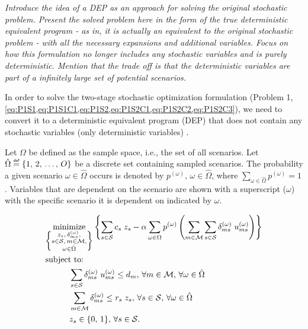 \documentclass[12pt,dvips]{report}
\newcommand\myeq{\mathrel{\overset{\makebox[0pt]{\mbox{\normalfont\tiny\sffamily def}}}{=}}}
\begin{document}
\textit{Introduce the idea of a DEP as an approach for solving the original stochastic problem.  Present the solved problem here in the form of the true deterministic equivalent program - as in, it is actually an equivalent to the original stochastic problem - with all the necessary expansions and additional variables.  Focus on how this formulation no longer includes any stochastic variables and is purely deterministic.  Mention that the trade off is that the deterministic variables are part of a infinitely large set of potential scenarios.}

In order to solve the two-stage stochastic optimization formulation (Problem 1, \cref{eq:P1S1,eq:P1S1C1,eq:P1S2,eq:P1S2C1,eq:P1S2C2,eq:P1S2C3}), we need to convert it to a deterministic equivalent program (DEP) that does not contain any stochastic variables (only deterministic variables) \cite{stochprogramming}.

Let $\Omega$ be defined as the sample space, i.e., the set of all scenarios.  Let $\hat{\Omega} \myeq \{1,\, 2,\, \ldots,\, O\}$ be a discrete set containing sampled scenarios.  The probability a given scenario $\omega \in \hat{\Omega}$ occurs is denoted by $p^{(\omega)},\, \omega \in \hat{\Omega}$, where $\sum_{\omega \in \hat{\Omega}} p^{(\omega)} = 1$.  Variables that are dependent on the scenario are shown with a superscript ($\omega$) with the specific scenario it is dependent on indicated by $\omega$.

\vspace{3mm}
\begin{tcolorbox}[title = Problem 2 (Deterministic Equivalent Program of Problem 1)]
\begin{align}
& \underset{\left\{ \substack{
	z_s,\, \delta_{ms}^{(\omega)},\\
	s \in \mathcal{S},\, m \in \mathcal{M},\\
	\omega \in \hat{\Omega}} \right\}} {\text{minimize}}
\left\{ \sum_{s \in \mathcal{S}} c_s \; z_s - \alpha \sum_{\omega \in \Omega} p^{(\omega)} \left( \sum_{m \in \mathcal{M}} \sum_{s \in \mathcal{S}} \delta_{ms}^{(\omega)} \; u_{ms}^{(\omega)} \right) \right\} \label{eq:P2}\\
& \text{subject to:}  \nonumber \\
& \hspace{0.4in} \sum_{s \in \mathcal{S}} \delta_{ms}^{(\omega)} \; u_{ms}^{(\omega)} \leq d_m,\, \forall m \in \mathcal{M},\, \forall \omega \in \hat{\Omega} \label{eq:P2C1}\\
& \hspace{0.4in} \sum_{m \in \mathcal{M}} \delta_{ms}^{(\omega)} \leq r_s \; z_s,\, \forall s \in \mathcal{S},\, \forall \omega \in \hat{\Omega} \label{eq:P2C2}\\
& \hspace{0.4in} z_s \in \{0,\, 1\},\, \forall s \in \mathcal{S}. \label{eq:P2C3}
\end{align}
\end{tcolorbox}
\end{document}
